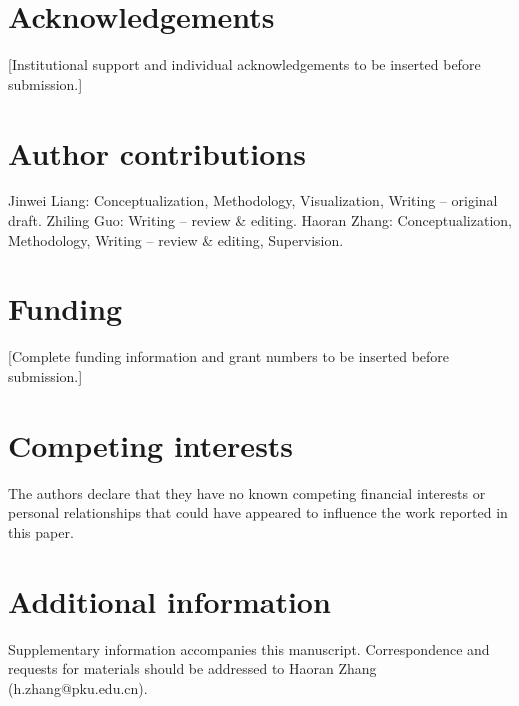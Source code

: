 \documentclass[lineno,pdflatex,sn-nature]{sn-jnl}
\begin{document}
\section*{Acknowledgements}

[Institutional support and individual acknowledgements to be inserted before submission.]

\section*{Author contributions}

Jinwei Liang: Conceptualization, Methodology, Visualization, Writing -- original draft. Zhiling Guo: Writing -- review \& editing. Haoran Zhang: Conceptualization, Methodology, Writing -- review \& editing, Supervision.

\section*{Funding}

[Complete funding information and grant numbers to be inserted before submission.]

\section*{Competing interests}

The authors declare that they have no known competing financial interests or personal relationships that could have appeared to influence the work reported in this paper.

\section*{Additional information}

Supplementary information accompanies this manuscript. Correspondence and requests for materials should be addressed to Haoran Zhang (h.zhang@pku.edu.cn).

\clearpage
\end{document}
